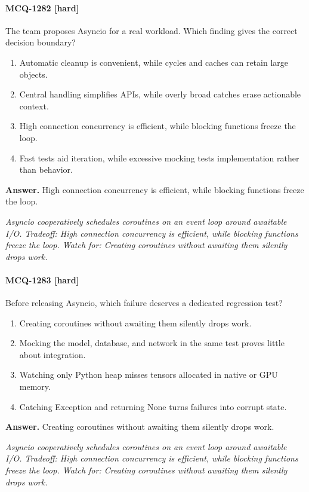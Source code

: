 \paragraph{MCQ-1282 [hard]} The team proposes Asyncio for a real workload. Which finding gives the correct decision boundary?
\begin{enumerate}[label=\Alph*.]
\item Automatic cleanup is convenient, while cycles and caches can retain large objects.
\item Central handling simplifies APIs, while overly broad catches erase actionable context.
\item High connection concurrency is efficient, while blocking functions freeze the loop.
\item Fast tests aid iteration, while excessive mocking tests implementation rather than behavior.
\end{enumerate}
\noindent\textbf{Answer.} High connection concurrency is efficient, while blocking functions freeze the loop.
\par\textit{Asyncio cooperatively schedules coroutines on an event loop around awaitable I/O. Tradeoff: High connection concurrency is efficient, while blocking functions freeze the loop. Watch for: Creating coroutines without awaiting them silently drops work.}
\paragraph{MCQ-1283 [hard]} Before releasing Asyncio, which failure deserves a dedicated regression test?
\begin{enumerate}[label=\Alph*.]
\item Creating coroutines without awaiting them silently drops work.
\item Mocking the model, database, and network in the same test proves little about integration.
\item Watching only Python heap misses tensors allocated in native or GPU memory.
\item Catching Exception and returning None turns failures into corrupt state.
\end{enumerate}
\noindent\textbf{Answer.} Creating coroutines without awaiting them silently drops work.
\par\textit{Asyncio cooperatively schedules coroutines on an event loop around awaitable I/O. Tradeoff: High connection concurrency is efficient, while blocking functions freeze the loop. Watch for: Creating coroutines without awaiting them silently drops work.}
